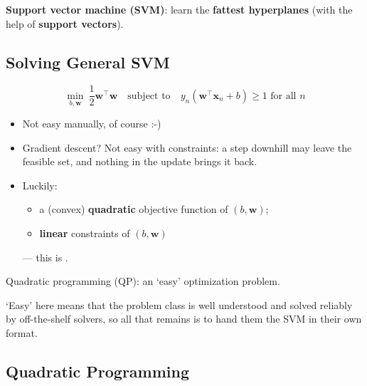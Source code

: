 \begin{moral}
    \textbf{Support vector machine (SVM)}: learn the \textbf{fattest
    hyperplanes} (with the help of \textbf{support vectors}).
\end{moral}

\subsection{Solving General SVM}

\[
    \min_{b, \bm{w}} \ \frac{1}{2} \bm{w}^\top \bm{w} \quad \text{subject
    to} \quad y_n (\bm{w}^\top \bm{x}_n + b) \ge 1 \text{ for all } n
\]
\begin{itemize}
    \item Not easy manually, of course :-)
    \item Gradient descent? Not easy with constraints: a step downhill may
        leave the feasible set, and nothing in the update brings it back.
    \item Luckily:
        \begin{itemize}
            \item a (convex) \textbf{quadratic} objective function of \((b,
                \bm{w})\);
            \item \textbf{linear} constraints of \((b, \bm{w})\)
        \end{itemize}
        --- this is .
\end{itemize}

\begin{moral}
    Quadratic programming (QP): an `easy' optimization problem.
\end{moral}

`Easy' here means that the problem class is well understood and solved
reliably by off-the-shelf solvers, so all that remains is to hand them the
SVM in their own format.

\subsection{Quadratic Programming}

